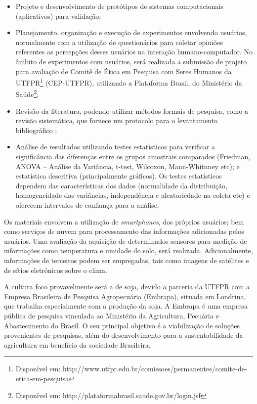 \documentclass[12pt]{article}
\begin{document}
\begin{itemize}
	\item Projeto e desenvolvimento de protótipos de sistemas computacionais (aplicativos) para validação;
	\item Planejamento, organização e execução de experimentos envolvendo usuários, normalmente com a utilização de questionários para coletar opiniões referentes as percepções desses usuários na interação humano-computador. No âmbito de experimentos com usuários, será realizada a submissão de projeto para avaliação de Comitê de Ética em Pesquisa com Seres Humanos da UTFPR\footnote{Disponível em: http://www.utfpr.edu.br/comissoes/permanentes/comite-de-etica-em-pesquisa} (CEP-UTFPR), utilizando a Plataforma Brasil, do Ministério da Saúde\footnote{Disponível em: http://plataformabrasil.saude.gov.br/login.jsf};
	\item Revisão da literatura, podendo utilizar métodos formais de pesquisa, como a revisão sistemática, que fornece um protocolo para o levantamento bibliográfico \cite{Kitchenham:2004};
	\item Análise de resultados utilizando testes estatísticos para verificar a significância das diferenças entre os grupos amostrais comparados (Friedman, ANOVA – Análise da Variância, t-test, Wilcoxon, Mann-Whitnney etc); e estatística descritiva (principalmente gráficos). Os testes estatísticos dependem das características dos dados (normalidade da distribuição, homogeneidade das variâncias, independência e aleatoriedade na coleta etc) e oferecem intervalos de confiança para a análise.
\end{itemize}

Os materiais envolvem a utilização de \textit{smartphones}, dos próprios usuários; bem como serviços de nuvem para processamento das informações adicionadas pelos usuários. Uma avaliação da aquisição de determinados sensores para medição de informações como temperatura e umidade do solo, será realizada. Adicionalmente, informações de terceiros podem ser empregadas, tais como imagens de satélites e de sítios eletrônicos sobre o clima. 		

A cultura foco provavelmente será a de soja, devido a parceria da UTFPR com a Empresa Brasileira de Pesquisa Agropecuária (Embrapa), situada em Londrina, que trabalha especialmente com a produção da soja. A Embrapa é uma empresa pública de pesquisa vinculada ao Ministério da Agricultura, Pecuária e Abastecimento do Brasil. O seu principal objetivo é a viabilização de soluções provenientes de pesquisas, além do desenvolvimento para a sustentabilidade da agricultura em benefício da sociedade Brasileira. 
\end{document}
